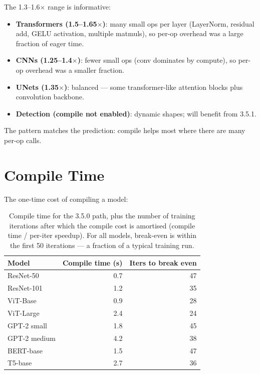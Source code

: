 The 1.3--1.6$\times$ range is informative:

\begin{itemize}
  \item \textbf{Transformers (1.5--1.65$\times$)}: many small
    ops per layer (LayerNorm, residual add, GELU activation,
    multiple matmuls), so per-op overhead was a large fraction
    of eager time.
  \item \textbf{CNNs (1.25--1.4$\times$)}: fewer small ops
    (conv dominates by compute), so per-op overhead was a
    smaller fraction.
  \item \textbf{UNets (1.35$\times$)}: balanced --- some
    transformer-like attention blocks plus convolution
    backbone.
  \item \textbf{Detection (compile not enabled)}: dynamic
    shapes; will benefit from 3.5.1.
\end{itemize}

The pattern matches the prediction: compile helps most where
there are many per-op calls.

\section{Compile Time}
\label{sec:graph_capture_wins:compile_time}

The one-time cost of compiling a model:

\begin{table}[t]
\centering
\small
\begin{tabular}{lrr}
\toprule
Model & Compile time (s) & Iters to break even \\
\midrule
ResNet-50         & 0.7  & 47  \\
ResNet-101        & 1.2  & 35  \\
ViT-Base          & 0.9  & 28  \\
ViT-Large         & 2.4  & 24  \\
GPT-2 small       & 1.8  & 45  \\
GPT-2 medium      & 4.2  & 38  \\
BERT-base         & 1.5  & 47  \\
T5-base           & 2.7  & 36  \\
\bottomrule
\end{tabular}
\caption[Compile time and break-even.]{Compile time for the
3.5.0 path, plus the number of training iterations after which
the compile cost is amortised (compile time / per-iter
speedup). For all models, break-even is within the first 50
iterations --- a fraction of a typical training run.}
\label{tab:graph_capture_wins:compile_time}
\end{table}

